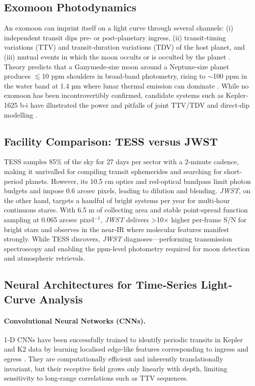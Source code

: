 \documentclass[11pt]{article}
\begin{document}
\subsection{Exomoon Photodynamics}
An exomoon can imprint itself on a light curve through several channels: (i) independent transit dips pre‐ or post‐planetary ingress, (ii) transit‐timing variations (TTV) and transit‐duration variations (TDV) of the host planet, and (iii) mutual events in which the moon occults or is occulted by the planet \citep{agolfab24}.  
Theory predicts that a Ganymede‐size moon around a Neptune‐size planet produces $\lesssim$10 ppm shoulders in broad‐band photometry, rising to $\sim$100 ppm in the water band at 1.4 µm where lunar thermal emission can dominate \citep{exomoonir24}.  
While no exomoon has been incontrovertibly confirmed, candidate systems such as Kepler‐1625 b‐i have illustrated the power and pitfalls of joint TTV/TDV and direct‐dip modelling \citep{kepler1625debate22}.  

\subsection{Facility Comparison: TESS versus JWST}
TESS samples 85\% of the sky for 27 days per sector with a 2-minute cadence, making it unrivalled for compiling transit ephemerides and searching for short‐period planets.  
However, its 10.5 cm optics and red‐optical bandpass limit photon budgets and impose 0.6 arcsec pixels, leading to dilution and blending.  
\textit{JWST}, on the other hand, targets a handful of bright systems per year for multi‐hour continuous stares.  
With 6.5 m of collecting area and stable point‐spread function sampling at 0.065 arcsec pixel$^{-1}$, \textit{JWST} delivers >10× higher per‐frame S/N for bright stars and observes in the near‐IR where molecular features manifest strongly.  
While TESS discovers, \textit{JWST} diagnoses—performing transmission spectroscopy and enabling the ppm‐level photometry required for moon detection and atmospheric retrievals.  

\subsection{Neural Architectures for Time‐Series Light‐Curve Analysis}
\paragraph{Convolutional Neural Networks (CNNs).}
1-D CNNs have been successfully trained to identify periodic transits in Kepler and K2 data by learning localised edge‐like features corresponding to ingress and egress \citep{cnnexo24,shalluevander18}.  
They are computationally efficient and inherently translationally invariant, but their receptive field grows only linearly with depth, limiting sensitivity to long‐range correlations such as TTV sequences.
\end{document}
